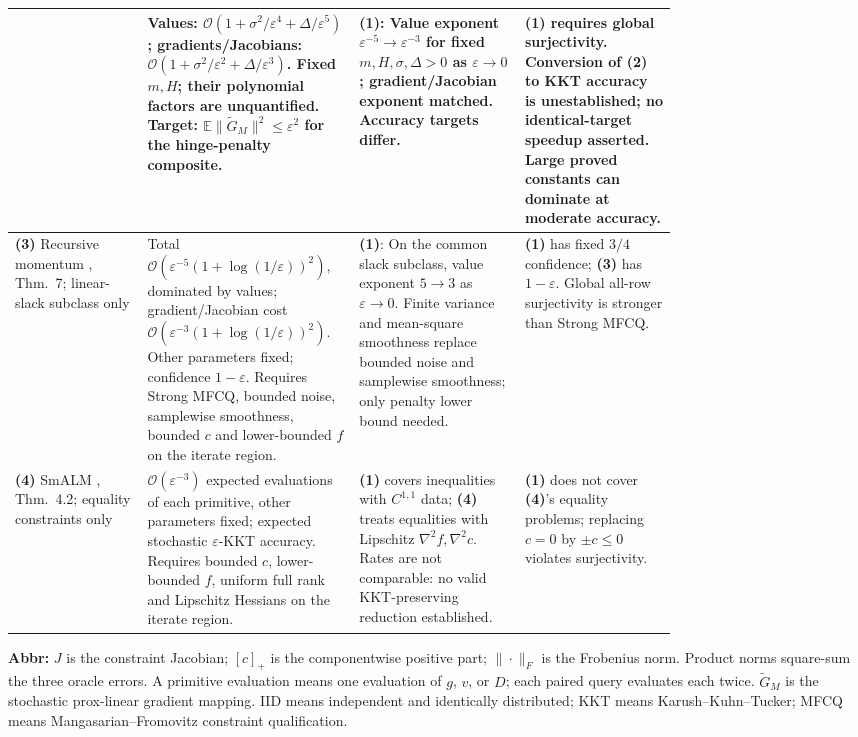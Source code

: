 \begin{table}[tp]
\begin{threeparttable}
\begin{tabularx}{\linewidth}{@{}>{\raggedright\arraybackslash}p{0.20\linewidth}>{\raggedright\arraybackslash}p{0.32\linewidth}>{\raggedright\arraybackslash}p{0.25\linewidth}>{\raggedright\arraybackslash}X@{}}
& Values: $\mathcal{O}(1+\sigma^2/\varepsilon^4+\Delta/\varepsilon^5)$; gradients/Jacobians: $\mathcal{O}(1+\sigma^2/\varepsilon^2+\Delta/\varepsilon^3)$. Fixed $m,H$; their polynomial factors are unquantified. Target: $\mathbb{E}\|\widetilde G_M\|^2\le\varepsilon^2$ for the hinge-penalty composite.
& \textbf{(1)}: Value exponent $\varepsilon^{-5}\to\varepsilon^{-3}$ for fixed $m,H,\sigma,\Delta>0$ as $\varepsilon\to0$; gradient/Jacobian exponent matched. Accuracy targets differ.
& \textbf{(1)} requires global surjectivity. Conversion of \textbf{(2)} to KKT accuracy is unestablished; no identical-target speedup asserted. Large proved constants can dominate at moderate accuracy. \\
\midrule
\textbf{(3)} Recursive momentum \citep{ssiShiWang2025v2}, Thm.~7; linear-slack subclass only
& Total $\mathcal{O}(\varepsilon^{-5}(1+\log(1/\varepsilon))^2)$, dominated by values; gradient/Jacobian cost $\mathcal{O}(\varepsilon^{-3}(1+\log(1/\varepsilon))^2)$. Other parameters fixed; confidence $1-\varepsilon$. Requires Strong MFCQ, bounded noise, samplewise smoothness, bounded $c$ and lower-bounded $f$ on the iterate region.
& \textbf{(1)}: On the common slack subclass, value exponent $5\to3$ as $\varepsilon\to0$. Finite variance and mean-square smoothness replace bounded noise and samplewise smoothness; only penalty lower bound needed.
& \textbf{(1)} has fixed $3/4$ confidence; \textbf{(3)} has $1-\varepsilon$. Global all-row surjectivity is stronger than Strong MFCQ.  \\
\midrule
\textbf{(4)} SmALM \citep{ssiCui2026}, Thm.~4.2; equality constraints only
& $\mathcal{O}(\varepsilon^{-3})$ expected evaluations of each primitive, other parameters fixed; expected stochastic $\varepsilon$-KKT accuracy. Requires bounded $c$, lower-bounded $f$, uniform full rank and Lipschitz Hessians on the iterate region.
& \textbf{(1)} covers inequalities with $C^{1,1}$ data; \textbf{(4)} treats equalities with Lipschitz $\nabla^2 f,\nabla^2 c$. Rates are not comparable: no valid KKT-preserving reduction established.
& \textbf{(1)} does not cover \textbf{(4)}'s equality problems; replacing $c=0$ by $\pm c\le0$ violates surjectivity. \\
\bottomrule
\end{tabularx}
\begin{tablenotes}[flushleft]\footnotesize
\item[] \textbf{Abbr:} $J$ is the constraint Jacobian; $[c]_+$ is the componentwise positive part; $\|\cdot\|_F$ is the Frobenius norm. Product norms square-sum the three oracle errors. A primitive evaluation means one evaluation of $g$, $v$, or $D$; each paired query evaluates each twice. $\widetilde G_M$ is the stochastic prox-linear gradient mapping. IID means independent and identically distributed; KKT means Karush--Kuhn--Tucker; MFCQ means Mangasarian--Fromovitz constraint qualification.
\end{tablenotes}
\end{threeparttable}
\end{table}
\clearpage
